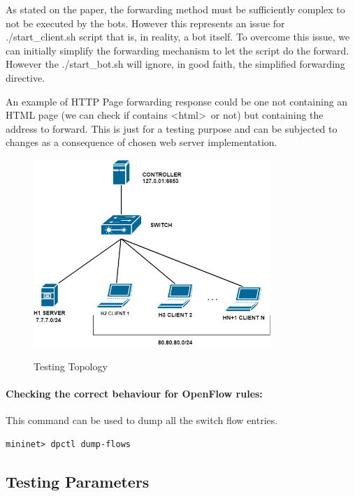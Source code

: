 As stated on the paper, the forwarding method must be sufficiently complex to not be executed by the bots. However this represents an issue for ./start\_client.sh script that is, in reality, a bot itself. To overcome this issue, we can initially simplify the forwarding mechanism to let the script do the forward. However the ./start\_bot.sh will ignore, in good faith, the simplified forwarding directive.

An example of HTTP Page forwarding response could be one not containing an HTML page (we can check if contains \textless html\textgreater\ or not) but containing the address to forward. This is just for a testing purpose and can be subjected to changes as a consequence of chosen web server implementation.

\begin{figure}[H]
\begin{center}
\includegraphics[width=0.8\textwidth]{images/TestingTopology.png}
\label{fig:testing}
\caption{Testing Topology}
\end{center}
\end{figure}

\paragraph{Checking the correct behaviour for OpenFlow rules:}
This command can be used to dump all the switch flow entries.
\begin{lstlisting}
mininet> dpctl dump-flows
\end{lstlisting}

\subsection{Testing Parameters}

